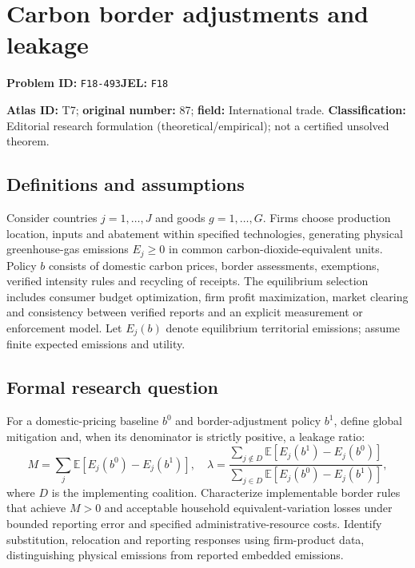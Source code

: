 \documentclass[11pt,a4paper]{article}
\begin{document}
\section*{Carbon border adjustments and leakage}
\textbf{Problem ID:} \texttt{F18-493}\quad \textbf{JEL:} \texttt{F18}\par
\label{problem:OP-0087}
\label{atlas:prob:T7}

\noindent\textbf{Atlas ID:} T7; \textbf{original number:} 87; \textbf{field:} International trade. \textbf{Classification:} Editorial research formulation (theoretical/empirical); not a certified unsolved theorem.

\subsection*{Definitions and assumptions}
Consider countries $j=1,\ldots,J$ and goods $g=1,\ldots,G$. Firms choose production location, inputs and abatement within specified technologies, generating physical greenhouse-gas emissions $E_j\ge0$ in common carbon-dioxide-equivalent units. Policy $b$ consists of domestic carbon prices, border assessments, exemptions, verified intensity rules and recycling of receipts. The equilibrium selection includes consumer budget optimization, firm profit maximization, market clearing and consistency between verified reports and an explicit measurement or enforcement model. Let $E_j(b)$ denote equilibrium territorial emissions; assume finite expected emissions and utility.

\subsection*{Formal research question}
For a domestic-pricing baseline $b^0$ and border-adjustment policy $b^1$, define global mitigation and, when its denominator is strictly positive, a leakage ratio:
\[
 M=\sum_j\mathbb E[E_j(b^0)-E_j(b^1)],\quad
 \lambda=\frac{\sum_{j\notin D}\mathbb E[E_j(b^1)-E_j(b^0)]}
                 {\sum_{j\in D}\mathbb E[E_j(b^0)-E_j(b^1)]},
\]
where $D$ is the implementing coalition. Characterize implementable border rules that achieve $M>0$ and acceptable household equivalent-variation losses under bounded reporting error and specified administrative-resource costs. Identify substitution, relocation and reporting responses using firm-product data, distinguishing physical emissions from reported embedded emissions.
\end{document}
